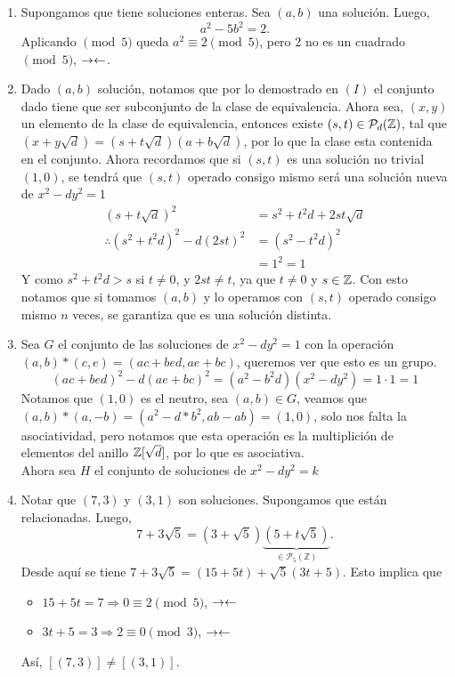 \begin{sol}
\begin{enumerate}[label = (\roman*)]
		\item Supongamos que tiene soluciones enteras. Sea $(a, b)$ una solución. Luego,
		      \[a^2 - 5b^2 = 2.\]
		      Aplicando $\pmod{5}$ queda $a^2 \equiv 2 \pmod{5}$, pero 2 no es un cuadrado $\pmod{5}$, $\rightarrow\leftarrow$.
		\item Dado $(a,b)$ solución, notamos que por lo demostrado en $(I)$ el conjunto dado tiene que ser subconjunto de la clase de equivalencia. Ahora sea, $(x,y)$ un elemento de la clase de equivalencia, entonces existe $(s,t)\in\mathcal{P}_d(\mathbb{Z})$, tal que $(x+y\sqrt{d})=(s+t\sqrt{d})(a+b\sqrt{d})$, por lo que la clase esta contenida en el conjunto. Ahora recordamos que si $(s,t)$ es una solución no trivial $(1,0)$, se tendrá que $(s,t)$ operado consigo mismo será una solución nueva de $x^2-dy^2=1$
		      \begin{align*}
			      (s+t\sqrt{d})^2                 & = s^2+t^2d+2st\sqrt{d} \\
			      \therefore(s^2+t^2d)^2-d(2st)^2 & = (s^2-t^2d)^2         \\
			                                      & = 1^2 = 1
		      \end{align*}
		      Y como $s^2+t^2d > s$ si $t\neq0$, y $2st\neq t$, ya que $t\neq 0$ y $s\in\mathbb{Z}$. Con esto notamos que si tomamos $(a,b)$ y lo operamos con $(s,t)$ operado consigo mismo $n$ veces, se garantiza que es una solución distinta.

		\item Sea $G$ el conjunto de las soluciones de $x^2-dy^2=1$ con la operación $(a,b)*(c,e)=(ac+bed,ae+bc)$, queremos ver que esto es un grupo.
		\[
			(ac+bed)^2-d(ae+bc)^2=(a^2 - b^2 d) (x^2 - d y^2)=1\cdot 1=1
		\]
		Notamos que $(1,0)$ es el neutro, sea $(a,b)\in G$, veamos que $(a,b)*(a,-b)=(a^2-d*b^2,ab-ab)=(1,0)$, solo nos falta la asociatividad, pero notamos que esta operación es la multiplición de elementos del anillo $\mathbb{Z}[\sqrt{d}]$, por lo que es asociativa.\\
		Ahora sea $H$ el conjunto de soluciones de $x^2-dy^2=k$
		
		\item Notar que $(7, 3)$ y $(3, 1)$ son soluciones. Supongamos que están relacionadas. Luego,
		      \[7 + 3\sqrt{5} = (3 + \sqrt{5})\underbrace{(5 + t\sqrt{5})}_{\in \mathcal{P}_5 (\mathbb{Z})}.\]
		      Desde aquí se tiene $7 + 3\sqrt{5} = (15 + 5t) + \sqrt{5}(3t + 5)$.
		      Esto implica que \begin{itemize}
			      \item $15 + 5t = 7 \Rightarrow 0 \equiv 2 \pmod 5$, $\rightarrow\leftarrow$
			      \item $3t + 5 = 3 \Rightarrow 2 \equiv 0 \pmod 3$, $\rightarrow\leftarrow$
		      \end{itemize}
		      Así, $[(7, 3)] \not= [(3, 1)]$.
	\end{enumerate}
\end{sol}

